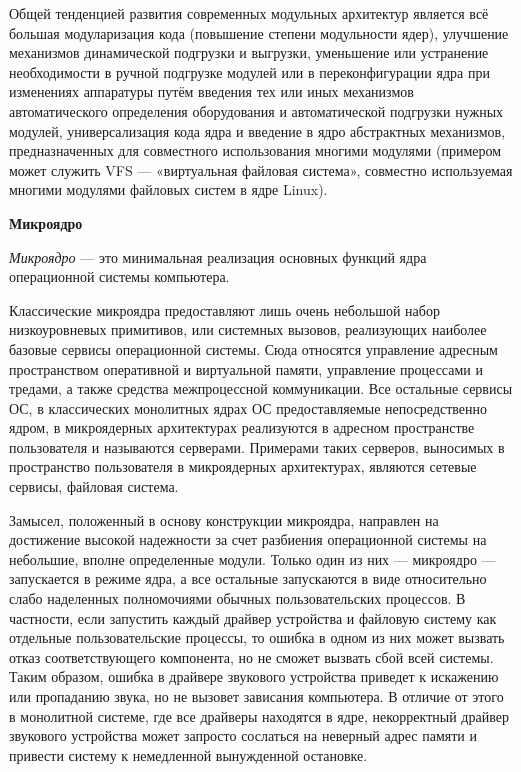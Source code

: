 Общей тенденцией развития современных модульных архитектур является всё большая модуларизация кода (повышение степени модульности ядер), улучшение механизмов динамической подгрузки и выгрузки, уменьшение или устранение необходимости в ручной подгрузке модулей или в переконфигурации ядра при изменениях аппаратуры путём введения тех или иных механизмов автоматического определения оборудования и автоматической подгрузки нужных модулей, универсализация кода ядра и введение в ядро абстрактных механизмов, предназначенных для совместного использования многими модулями (примером может служить VFS — «виртуальная файловая система», совместно используемая многими модулями файловых систем в ядре Linux).
\newline

\textbf{Микроядро}

\textit{Микроядро} — это минимальная реализация основных функций ядра операционной системы компьютера.

Классические микроядра предоставляют лишь очень небольшой набор низкоуровневых примитивов, или системных вызовов, реализующих наиболее базовые сервисы операционной системы. Сюда относятся управление адресным пространством оперативной и виртуальной памяти, управление процессами и тредами, а также средства межпроцессной коммуникации.
Все остальные сервисы ОС, в классических монолитных ядрах ОС предоставляемые непосредственно ядром, в микроядерных архитектурах реализуются в адресном пространстве пользователя и называются серверами. Примерами таких серверов, выносимых в пространство пользователя в микроядерных архитектурах, являются сетевые сервисы, файловая система.

Замысел, положенный в основу конструкции микроядра, направлен на достижение высокой надежности за счет разбиения операционной системы на небольшие, вполне определенные модули. Только один из них — микроядро — запускается в режиме ядра, а все остальные запускаются в виде относительно слабо наделенных полномочиями обычных пользовательских процессов. В частности, если запустить каждый драйвер устройства и файловую систему как отдельные пользовательские процессы, то ошибка в одном из них может вызвать отказ соответствующего компонента, но не сможет вызвать сбой всей системы. Таким образом, ошибка в драйвере звукового устройства приведет к искажению или пропаданию звука, но не вызовет зависания компьютера. В отличие от этого в монолитной системе, где все драйверы находятся в ядре, некорректный драйвер звукового устройства может запросто сослаться на неверный адрес памяти и привести систему к немедленной вынужденной остановке.

